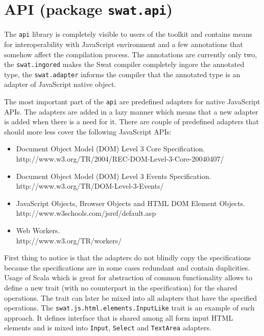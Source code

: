 \documentclass[12pt,a4paper]{report}
\begin{document}
\section{API (package \texttt{swat.api})}

The \texttt{api} library is completely visible to users of the toolkit and contains means for interoperability with JavaScript environment and a few annotations that somehow affect the compilation process. The annotations are currently only two, the \texttt{swat.ingored} makes the Swat compiler completely ingore the annotated type, the \texttt{swat.adapter} informs the compiler that the annotated type is an adapter of JavaScript native object.

The most important part of the \texttt{api} are predefined adapters for native JavaScript APIs. The adapters are added in a lazy manner which means that a new adapter is added when there is a need for it. There are couple of predefined adapters that should more less cover the following JavaScript APIs:

\begin{itemize}
\item Document Object Model (DOM) Level 3 Core Specification.\\
http://www.w3.org/TR/2004/REC-DOM-Level-3-Core-20040407/
\item Document Object Model (DOM) Level 3 Events Specification.\\
http://www.w3.org/TR/DOM-Level-3-Events/
\item JavaScript Objects, Browser Objects and HTML DOM Element Objects.\\
http://www.w3schools.com/jsref/default.asp
\item Web Workers.\\
http://www.w3.org/TR/workers/
\end{itemize}

First thing to notice is that the adapters do not blindly copy the specifications because the specifications are in some cases redundant and contain duplicities. Usage of Scala which is great for abstraction of common functionality allows to define a new trait (with no counterpart in the specification) for the shared operations. The trait can later be mixed into all adapters that have the specified operations. The \texttt{swat.js.html.elements.InputLike} trait is an example of such approach. It defines interface that is shared among all form input HTML elements and is mixed into \texttt{Input}, \texttt{Select} and \texttt{TextArea} adapters.
\end{document}

